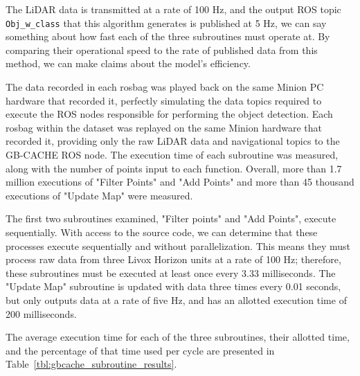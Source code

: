 The LiDAR data is transmitted at a rate of 100 Hz, and the output ROS topic \texttt{Obj\_w\_class} that this algorithm generates is published at 5 Hz, we can say something about how fast each of the three subroutines must operate at.
By comparing their operational speed to the rate of published data from this method, we can make claims about the model's efficiency.

The data recorded in each rosbag was played back on the same Minion PC hardware that recorded it, perfectly simulating the data topics required to execute the ROS nodes responsible for performing the object detection.
Each rosbag within the dataset was replayed on the same Minion hardware that recorded it, providing only the raw LiDAR data and navigational topics to the GB-CACHE ROS node.
The execution time of each subroutine was measured, along with the number of points input to each function.
Overall, more than 1.7 million executions of "Filter Points" and "Add Points"  and more than 45 thousand executions of "Update Map" were measured. 

The first two subroutines examined, "Filter points" and "Add Points", execute sequentially. 
With access to the source code, we can determine that these processes execute sequentially and without parallelization.
This means they must process raw data from three Livox Horizon units at a rate of 100 Hz; therefore, these subroutines must be executed at least once every 3.33 milliseconds.  
The "Update Map" subroutine is updated with data three times every 0.01 seconds, but only outputs data at a rate of five Hz, and has an allotted execution time of 200 milliseconds.

The average execution time for each of the three subroutines, their allotted time, and the percentage of that time used per cycle are presented in Table~\ref{tbl:gbcache_subroutine_results}.





